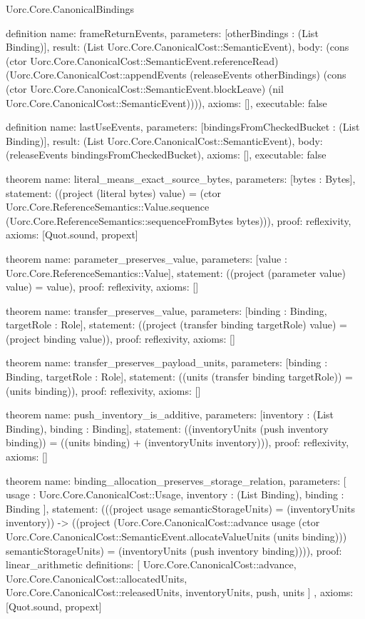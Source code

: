 \begin{lexlean}{Uorc.Core.CanonicalBindings}
\begin{semanticmodule}
definition{
  name: frameReturnEvents,
  parameters: [otherBindings : (List Binding)],
  result: (List Uorc.Core.CanonicalCost::SemanticEvent),
  body: (cons (ctor Uorc.Core.CanonicalCost::SemanticEvent.referenceRead) (Uorc.Core.CanonicalCost::appendEvents (releaseEvents otherBindings) (cons (ctor Uorc.Core.CanonicalCost::SemanticEvent.blockLeave) (nil Uorc.Core.CanonicalCost::SemanticEvent)))),
  axioms: [],
  executable: false
}

definition{
  name: lastUseEvents,
  parameters: [bindingsFromCheckedBucket : (List Binding)],
  result: (List Uorc.Core.CanonicalCost::SemanticEvent),
  body: (releaseEvents bindingsFromCheckedBucket),
  axioms: [],
  executable: false
}

theorem{
  name: literal_means_exact_source_bytes,
  parameters: [bytes : Bytes],
  statement: ((project (literal bytes) value) = (ctor Uorc.Core.ReferenceSemantics::Value.sequence (Uorc.Core.ReferenceSemantics::sequenceFromBytes bytes))),
  proof: reflexivity{},
  axioms: [Quot.sound, propext]
}

theorem{
  name: parameter_preserves_value,
  parameters: [value : Uorc.Core.ReferenceSemantics::Value],
  statement: ((project (parameter value) value) = value),
  proof: reflexivity{},
  axioms: []
}

theorem{
  name: transfer_preserves_value,
  parameters: [binding : Binding, targetRole : Role],
  statement: ((project (transfer binding targetRole) value) = (project binding value)),
  proof: reflexivity{},
  axioms: []
}

theorem{
  name: transfer_preserves_payload_units,
  parameters: [binding : Binding, targetRole : Role],
  statement: ((units (transfer binding targetRole)) = (units binding)),
  proof: reflexivity{},
  axioms: []
}

theorem{
  name: push_inventory_is_additive,
  parameters: [inventory : (List Binding), binding : Binding],
  statement: ((inventoryUnits (push inventory binding)) = ((units binding) + (inventoryUnits inventory))),
  proof: reflexivity{},
  axioms: []
}

theorem{
  name: binding_allocation_preserves_storage_relation,
  parameters: [
    usage : Uorc.Core.CanonicalCost::Usage,
    inventory : (List Binding),
    binding : Binding
  ],
  statement: (((project usage semanticStorageUnits) = (inventoryUnits inventory)) -> ((project (Uorc.Core.CanonicalCost::advance usage (ctor Uorc.Core.CanonicalCost::SemanticEvent.allocateValueUnits (units binding))) semanticStorageUnits) = (inventoryUnits (push inventory binding)))),
  proof: linear_arithmetic{
    definitions: [
      Uorc.Core.CanonicalCost::advance,
      Uorc.Core.CanonicalCost::allocatedUnits,
      Uorc.Core.CanonicalCost::releasedUnits,
      inventoryUnits,
      push,
      units
    ]
  },
  axioms: [Quot.sound, propext]
}


\end{semanticmodule}
\end{lexlean}
